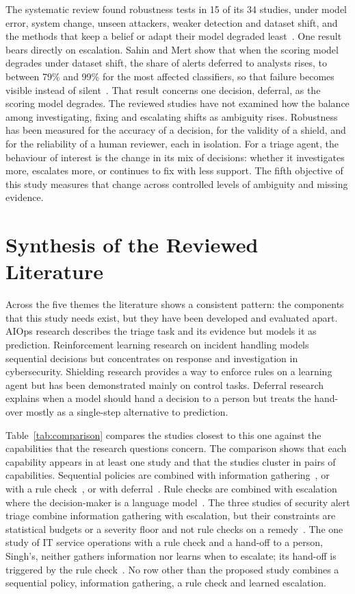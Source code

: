 The systematic review found robustness tests in 15 of its 34 studies, under model error, system change, unseen attackers, weaker detection and dataset shift, and the methods that keep a belief or adapt their model degraded least~\cite{opol2026slr,hammar2025,hammar2026belief}. One result bears directly on escalation. Sahin and Mert show that when the scoring model degrades under dataset shift, the share of alerts deferred to analysts rises, to between 79\% and 99\% for the most affected classifiers, so that failure becomes visible instead of silent~\cite{sahin2026}. That result concerns one decision, deferral, as the scoring model degrades. The reviewed studies have not examined how the balance among investigating, fixing and escalating shifts as ambiguity rises. Robustness has been measured for the accuracy of a decision, for the validity of a shield, and for the reliability of a human reviewer, each in isolation. For a triage agent, the behaviour of interest is the change in its mix of decisions: whether it investigates more, escalates more, or continues to fix with less support. The fifth objective of this study measures that change across controlled levels of ambiguity and missing evidence.

\section{Synthesis of the Reviewed Literature}

Across the five themes the literature shows a consistent pattern: the components that this study needs exist, but they have been developed and evaluated apart. AIOps research describes the triage task and its evidence but models it as prediction. Reinforcement learning research on incident handling models sequential decisions but concentrates on response and investigation in cybersecurity. Shielding research provides a way to enforce rules on a learning agent but has been demonstrated mainly on control tasks. Deferral research explains when a model should hand a decision to a person but treats the hand-over mostly as a single-step alternative to prediction.

Table~\ref{tab:comparison} compares the studies closest to this one against the capabilities that the research questions concern. The comparison shows that each capability appears in at least one study and that the studies cluster in pairs of capabilities. Sequential policies are combined with information gathering~\cite{dunsin2025,kim2025,wang2023hrlhf}, or with a rule check~\cite{alauthman2026,ravi2025}, or with deferral~\cite{zhang2026falcon}. Rule checks are combined with escalation where the decision-maker is a language model~\cite{pacella2026}. The three studies of security alert triage combine information gathering with escalation, but their constraints are statistical budgets or a severity floor and not rule checks on a remedy~\cite{sahin2026,kovtun2026,okafor2026}. The one study of IT service operations with a rule check and a hand-off to a person, Singh's, neither gathers information nor learns when to escalate; its hand-off is triggered by the rule check~\cite{singh2026}. No row other than the proposed study combines a sequential policy, information gathering, a rule check and learned escalation.

